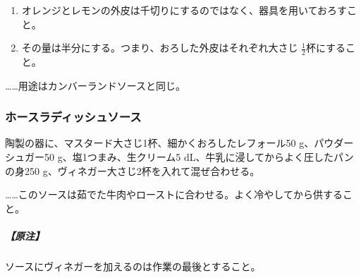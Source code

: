 \begin{recette}
\begin{enumerate}
\def\labelenumi{\arabic{enumi}.}
\item
  オレンジとレモンの外皮は千切りにするのではなく、器具を用いておろすこと。
\item
  その量は半分にする。つまり、おろした外皮はそれぞれ大さじ
  \(\frac{1}{2}\)杯にすること。
\end{enumerate}

\ldots{}\ldots{}用途はカンバーランドソースと同じ。

\atoaki{}

\hypertarget{cold-horseradish-sauce}{%
\subsubsection{ホースラディッシュソース}\label{cold-horseradish-sauce}}



陶製の器に、マスタード大さじ1杯、細かくおろしたレフォール50
g、パウダーシュガー50 g、塩1つまみ、生クリーム5
dL、牛乳に浸してからよく圧したパンの身250
g、ヴィネガー大さじ2杯を入れて混ぜ合わせる。

\ldots{}\ldots{}このソースは茹でた牛肉やローストに合わせる。よく冷やしてから供すること。

\hypertarget{horseradish-sauce}{%
\subparagraph{【原注】}\label{horseradish-sauce}}

ソースにヴィネガーを加えるのは作業の最後とすること。
\end{recette}